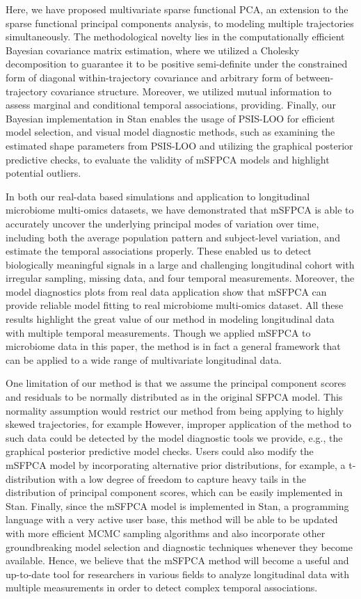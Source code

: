 \documentclass[aoas,preprint]{imsart}
\begin{document}
Here, we have proposed multivariate sparse functional PCA, an extension to the sparse functional principal components analysis, to modeling multiple trajectories simultaneously. The methodological novelty lies in the computationally efficient Bayesian covariance matrix estimation, where we utilized a Cholesky decomposition to guarantee it to be positive semi-definite under the constrained form of diagonal within-trajectory covariance and arbitrary form of between-trajectory covariance structure. Moreover, we utilized mutual information to assess marginal and conditional temporal associations, providing. Finally, our Bayesian implementation in \textsf{Stan} enables the usage of PSIS-LOO for efficient model selection, and visual model diagnostic methods, such as examining the estimated shape parameters from PSIS-LOO and utilizing the graphical posterior predictive checks, to evaluate the validity of mSFPCA models and highlight potential outliers. 

In both our real-data based simulations and application to longitudinal microbiome multi-omics datasets, we have demonstrated that mSFPCA is able to accurately uncover the underlying principal modes of variation over time, including both the average population pattern and subject-level variation, and estimate the temporal associations properly. These enabled us to detect biologically meaningful signals in a large and challenging longitudinal cohort with irregular sampling, missing data, and four temporal measurements. Moreover, the model diagnostics plots from real data application show that mSFPCA can provide reliable model fitting to real microbiome multi-omics dataset. All these results highlight the great value of our method in modeling longitudinal data with multiple temporal measurements. Though we applied mSFPCA to microbiome data in this paper, the method is in fact a general framework that can be applied to a wide range of multivariate longitudinal data. 

One limitation of our method is that we assume the principal component scores and residuals to be normally distributed as in the original SFPCA model. This normality assumption would restrict our method from being applying to highly skewed trajectories, for example However, improper application of the method to such data could be detected by the model diagnostic tools we provide, e.g., the graphical posterior predictive model checks. Users could also modify the mSFPCA model by incorporating alternative prior distributions, for example, a t-distribution with a low degree of freedom to capture heavy tails in the distribution of principal component scores, which can be easily implemented in \textsf{Stan}. Finally, since the mSFPCA model is implemented in \textsf{Stan}, a programming language with a very active user base, this method will be able to be updated with more efficient MCMC sampling algorithms and also incorporate other groundbreaking model selection and diagnostic techniques whenever they become available. Hence, we believe that the mSFPCA method will become a useful and up-to-date tool for researchers in various fields to analyze longitudinal data with multiple measurements in order to detect complex temporal associations.
\end{document}
